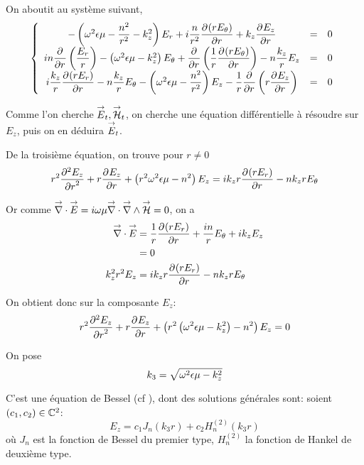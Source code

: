     On aboutit au système suivant,
    \begin{equation}
        \left\lbrace
        \begin{array}{ccc}
            -\left(\w^2\eps\mu -\frac{n^2}{r^2}  - k_z^2\right)E_r  +i\frac{n}{r^2}\ddr{r}{(rE_\theta)}  +k_z\ddr{r}{E_z} & = & 0\\
            in\ddr{r}{}\left(\frac{E_r}{r}\right) -\left(\w^2\eps\mu - k_z^2\right)E_\theta + \ddr{r}{}\left(\frac{1}{r}\ddr{r}{(rE_\theta)}\right)  - n\frac{k_z}{r}E_z & = & 0\\
            i\frac{k_z}{r}\ddr{r}{(rE_r)}  - n\frac{k_z}{r}E_\theta  -\left(\w^2\eps\mu - \frac{n^2}{r^2} \right)E_z - \frac{1}{r}\ddr{r}{}\left(r\ddr{r}{E_z}\right) & = & 0
        \end{array}
        \right.
    \end{equation}

    Comme l'on cherche $\vE_t, \vH_t$, on cherche une équation différentielle à résoudre sur $E_z$, puis on en déduira $\vE_t$.

    De la troisième  équation, on trouve pour $r\not=0$
    \begin{equation}
    r^2 \ddr[2]{r}{E_z} + r\ddr{r}{E_z} + \left(r^2\w^2\eps\mu - n^2\right)E_z =ik_zr\ddr{r}{(rE_r)} -  nk_zrE_\theta
    \end{equation}

    Or comme $\vdiv \vE = i\w\mu\vdiv\vrot\vH = 0$, on a
    \begin{align}
        \vdiv\vE &= \frac{1}{r}\ddr{r}{(rE_r)} + \frac{in}{r}E_\theta + ik_zE_z
        \\
        &=0
        \\
        k_z^2r^2 E_z &= ik_zr\ddr{r}{(rE_r)} - nk_zrE_\theta
    \end{align}

    On obtient donc sur la composante $E_z$:
    \begin{equation}
        r^2 \ddr[2]{r}{E_z} + r\ddr{r}{E_z} + \left(r^2\left(\w^2\eps\mu - k_z^2\right) - n^2\right)E_z = 0
    \end{equation}

    On pose 
    \begin{equation}
        k_3 = \sqrt{\w^2\eps\mu - k_z^2}
    \end{equation}

    C'est une équation de Bessel (cf \cite[eq (6.80)]{bowman_introduction_1958}), dont des solutions générales sont: soient $(c_1,c_2) \in \CC^2$:
    \begin{equation}
        E_z = c_1 J_n\left(k_3r\right) + c_2 H_n^{(2)}\left(k_3r\right)
    \end{equation}
    où $J_n$ est la fonction de Bessel du premier type, $H_n^{(2)}$ la fonction de Hankel de deuxième type. 

